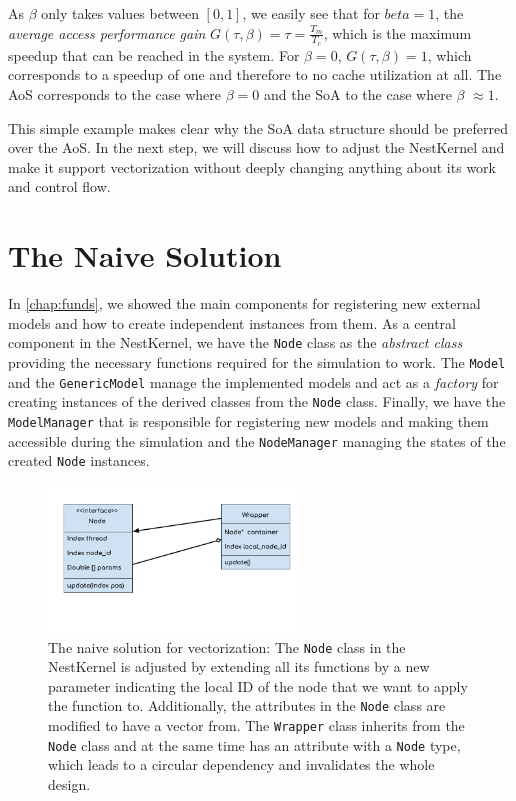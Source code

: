 As $\beta$ only takes values between $[0, 1]$, we easily see that for $beta = 1$, the \emph{average access performance gain} $G(\tau, \beta) = \tau = \frac{T_m}{T_c}$, which is the maximum speedup that can be reached in the system. For $\beta =0$, $G(\tau, \beta) = 1$, which corresponds to a speedup of one and therefore to no cache utilization at all. The AoS corresponds to the case where $\beta = 0$ and the SoA to the case where $\beta$ $\approx 1$.

This simple example makes clear why the SoA data structure should be preferred over the AoS. In the next step, we will discuss how to adjust the NestKernel and make it support vectorization without deeply changing anything about its work and control flow.

\section{The Naive Solution}

In \autoref{chap:funds}, we showed the main components for registering new external models and how to create independent instances from them. As a central component in the NestKernel, we have the \texttt{Node} class as the \emph{abstract class} providing the necessary functions required for the simulation to work. The \texttt{Model} and the \texttt{GenericModel} manage the implemented models and act as a \emph{factory} for creating instances of the derived classes from the \texttt{Node} class. Finally, we have the \texttt{ModelManager} that is responsible for registering new models and making them accessible during the simulation and the \texttt{NodeManager} managing the states of the created \texttt{Node} instances. 

\begin{figure}[h!]
\centering
\includegraphics[width=0.6\textwidth]{src/pic/wrapper.png}
\caption{The naive solution for vectorization: The \texttt{Node} class in the NestKernel is adjusted by extending all its functions by a new parameter indicating the local ID of the node that we want to apply the function to. Additionally, the attributes in the \texttt{Node} class are modified to have a vector from. The \texttt{Wrapper} class inherits from the \texttt{Node} class and at the same time has an attribute with a \texttt{Node} type, which leads to a circular dependency and invalidates the whole design.}
\label{fig:naive}
\end{figure}


